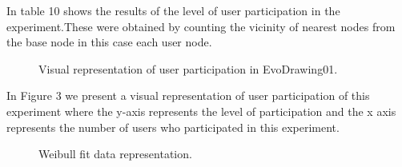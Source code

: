 In table 10 shows the results of the level of user participation in the
experiment.These were obtained by counting the vicinity of nearest nodes from
the base node in this case each user node.

\begin{figure}
\centering
{} %
\caption{Visual representation of user participation in EvoDrawing01.}
\label{fig:userP_2}   
\end{figure}


In Figure 3 we present a visual representation of user participation of this
experiment where the y-axis represents the level of participation and the x axis
represents the number of users who participated in this experiment.

\begin{figure}
\centering
{} %
\caption{Weibull fit data representation.}
\label{fig:weibull_2}   
\end{figure}














